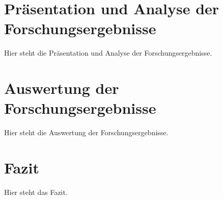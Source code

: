 \documentclass[11pt]{article}
\begin{document}
\clearpage

\section{Präsentation und Analyse der Forschungsergebnisse}
\label{sec:praesentation-und-analyse-der-forschungsergebnisse}

Hier steht die Präsentation und Analyse der Forschungsergebnisse.

\clearpage

\section{Auswertung der Forschungsergebnisse}
\label{sec:auswertung-der-forschungsergebnisse}

Hier steht die Auswertung der Forschungsergebnisse.

\clearpage

\section{Fazit}
\label{sec:fazit}

Hier steht das Fazit.

\clearpage

\makebibliography
\end{document}
